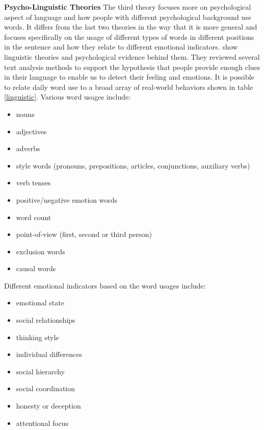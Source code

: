 \documentclass[11pt,a4paper]{article}
\begin{document}
\textbf{Psycho-Linguistic Theories}
The third theory focuses more on psychological aspect of language and how people with different psychological background use words. It differs from the last two theories in the way that it is more general and focuses specifically on the usage of different types of words in different positions in the sentence and how they relate to different emotional indicators. \citet{liwc} show linguistic theories and psychological evidence behind them. They reviewed several text analysis methods to support the hypothesis that people provide enough clues in their language to enable us to detect their feeling and emotions. It is possible to relate daily word use to a broad array of real-world behaviors shown in table \ref{linguistic}. %
Various word usages include:
\begin{itemize}
\item nouns
\item adjectives
\item adverbs
\item style words (pronouns, prepositions, articles, conjunctions, auxiliary verbs)
\item verb tenses
\item positive/negative emotion words
\item word count
\item point-of-view (first, second or third person)
\item exclusion words
\item causal words
\end{itemize}
Different emotional indicators based on the word usages include:
\begin{itemize}
\item emotional state
\item social relationships
\item thinking style
\item individual differences
\item social hierarchy
\item social coordination
\item honesty or deception
\item attentional focus
\end{itemize}
\end{document}
